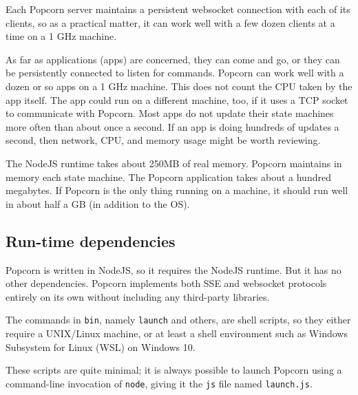 \documentclass[12pt]{article}
\begin{document}
Each Popcorn server maintains a persistent websocket connection with
each of its clients, so as a practical matter, it can work well with a
few dozen clients at a time on a 1 GHz machine.

As far as applications (apps) are concerned, they can come and go, or
they can be persistently connected to listen for commands. Popcorn can
work well with a dozen or so apps on a 1 GHz machine. This does not
count the CPU taken by the app itself. The app could run on a
different machine, too, if it uses a TCP socket to communicate with
Popcorn. Most apps do not update their state machines more often than
about once a second. If an app is doing hundreds of updates a second,
then network, CPU, and memory usage might be worth reviewing.

The NodeJS runtime takes about 250MB of real memory.  Popcorn
maintains in memory each state machine.  The Popcorn application takes
about a hundred megabytes. If Popcorn is the only thing running on a
machine, it should run well in about half a GB (in addition to the OS).

\subsection{Run-time dependencies}

Popcorn is written in NodeJS, so it requires the NodeJS runtime. But
it has no other dependencies. Popcorn implements both SSE and
websocket protocols entirely on its own without including any
third-party libraries.

The commands in \verb`bin`, namely \verb`launch` and others, are shell scripts,
so they either require a UNIX/Linux machine, or at least a shell
environment such as Windows Subsystem for Linux (WSL) on Windows 10.

These scripts are quite minimal; it is always possible to launch
Popcorn using a command-line invocation of \verb`node`, giving it the \verb`js`
file named \verb`launch.js`.
\end{document}
